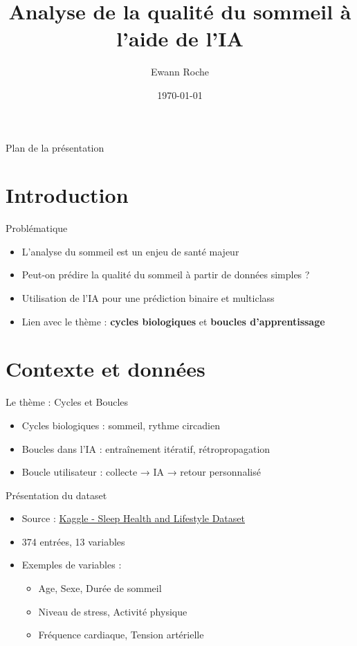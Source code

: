 \documentclass{beamer}
\title[TIPE - Cycles et Boucles]{Analyse de la qualité du sommeil à l'aide de l'IA}
\author{Ewann Roche}
\date{\today}
\begin{document}
\begin{frame}
  \titlepage
\end{frame}

\begin{frame}{Plan de la présentation}
  \tableofcontents
\end{frame}

\section{Introduction}

\begin{frame}{Problématique}
  \begin{itemize}
    \item L'analyse du sommeil est un enjeu de santé majeur
    \item Peut-on prédire la qualité du sommeil à partir de données simples ?
    \item Utilisation de l'IA pour une prédiction binaire et multiclass
    \item Lien avec le thème : \textbf{cycles biologiques} et \textbf{boucles d'apprentissage}
  \end{itemize}
\end{frame}

\section{Contexte et données}

\begin{frame}{Le thème : Cycles et Boucles}
  \begin{itemize}
    \item Cycles biologiques : sommeil, rythme circadien
    \item Boucles dans l'IA : entraînement itératif, rétropropagation
    \item Boucle utilisateur : collecte → IA → retour personnalisé
  \end{itemize}
\end{frame}

\begin{frame}{Présentation du dataset}
  \begin{itemize}
    \item Source : \href{https://www.kaggle.com/datasets/uom190346a/sleep-health-and-lifestyle-dataset}{Kaggle - Sleep Health and Lifestyle Dataset}
    \item 374 entrées, 13 variables
    \item Exemples de variables :
    \begin{itemize}
      \item Age, Sexe, Durée de sommeil
      \item Niveau de stress, Activité physique
      \item Fréquence cardiaque, Tension artérielle
    \end{itemize}
  \end{itemize}
\end{frame}
\end{document}
